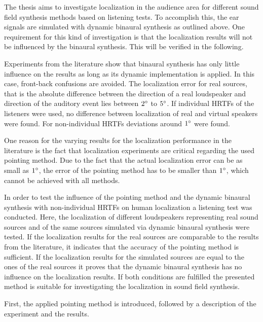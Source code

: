 The thesis aims to investigate localization in the audience area for different sound
field synthesis methods based on listening tests. To accomplish this, the ear signals
are simulated with dynamic binaural synthesis as outlined above. One requirement for this
kind of investigation is that the localization results will not be influenced by
the binaural synthesis. This will be verified in the following.

Experiments from the literature show that binaural synthesis has only
little influence on the results as long as its dynamic implementation is applied. In
this case, front-back confusions are avoided.
The localization error for real sources,
that is the absolute difference between the direction of a real
loudspeaker and direction of the auditory event lies between
$2^\circ$ to $5^\circ$.\autocite{Seeber2003a,Bronkhorst1995,Hess2004,Makous1990}
If individual \acp{HRTF} of the listeners were used, no difference between
localization of real and virtual speakers were found.
For non-individual \acp{HRTF} deviations
around $1^\circ$ were found.\autocite{Seeber2003a}

One reason for the varying results for the localization performance in the
literature is the fact that localization experiments are critical
regarding the used pointing method. Due to the fact that the actual localization error
can be as small
as $1^\circ$, the error of the pointing method has to be smaller than $1^\circ$, which
cannot be achieved with all methods.\autocite{Majdak2008,Seeber2003a}

In order to test the influence of the pointing method and the dynamic binaural
synthesis with non-individual \acp{HRTF} on human localization a listening test
was conducted. Here, the localization of different loudspeakers
representing real sound sources and of the same sources simulated via dynamic
binaural synthesis were tested. If the localization results for the real sources
are comparable to the results from the literature, it indicates that the
accuracy of the pointing method is sufficient. If the localization results for
the simulated sources are equal to the ones of the real sources it proves that
the dynamic binaural synthesis has no influence on the localization results. If
both conditions are fulfilled the presented method is suitable for investigating the
localization in sound field synthesis.

First, the applied pointing method is introduced, followed by a description of
the experiment and the results.


